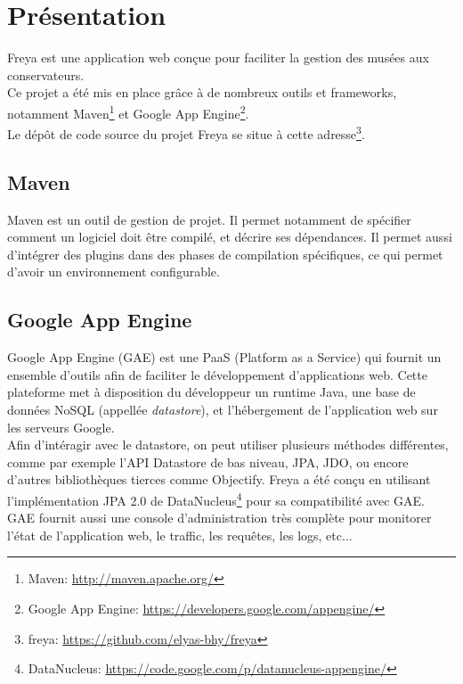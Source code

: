 \chapter{Présentation}
Freya est une application web conçue pour faciliter la gestion des musées aux
conservateurs.\\
Ce projet a été mis en place grâce à de nombreux outils et frameworks, notamment
Maven\footnote{Maven: \url{http://maven.apache.org/}} et Google App
Engine\footnote{Google App Engine:
\url{https://developers.google.com/appengine/}}.\\
Le dépôt de code source du projet Freya se situe à cette
adresse\footnote{freya: \url{https://github.com/elyas-bhy/freya}}.


\section{Maven}
Maven est un outil de gestion de projet. Il permet notamment de spécifier
comment un logiciel doit être compilé, et décrire ses dépendances. Il permet
aussi d’intégrer des plugins dans des phases de compilation spécifiques, ce qui
permet d’avoir un environnement configurable.

\section{Google App Engine}
Google App Engine (GAE) est une PaaS (Platform as a Service) qui fournit un
ensemble d’outils afin de faciliter le développement d’applications web. Cette
plateforme met à disposition du développeur un runtime Java, une base de données
NoSQL (appellée \emph{datastore}), et l’hébergement de l’application web sur les
serveurs Google.\\

Afin d’intéragir avec le datastore, on peut utiliser plusieurs méthodes
différentes, comme par exemple l’API Datastore de bas niveau, JPA, JDO, ou
encore d’autres bibliothèques tierces comme Objectify.
Freya a été conçu en utilisant l’implémentation JPA 2.0 de
DataNucleus\footnote{DataNucleus:
\url{https://code.google.com/p/datanucleus-appengine/}} pour sa compatibilité avec GAE.\\

GAE fournit aussi une console d’administration très complète pour monitorer
l’état de l’application web, le traffic, les requêtes, les logs, etc...
